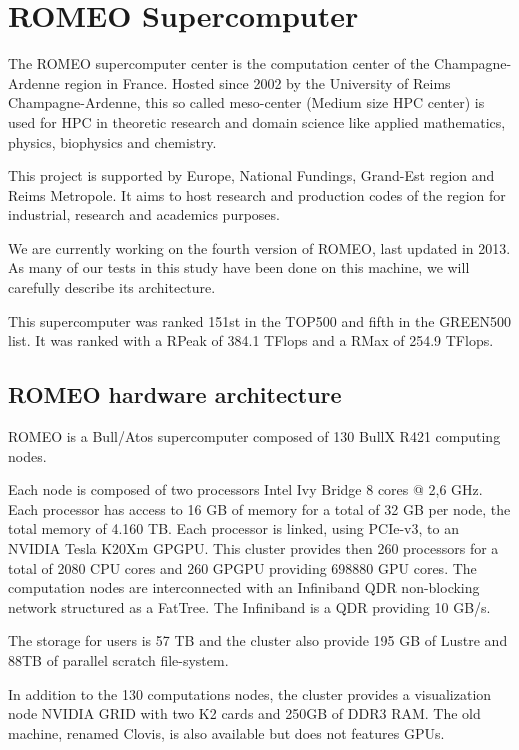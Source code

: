 \section{ROMEO Supercomputer}
The ROMEO supercomputer center is the computation center of the Champagne-Ardenne region in France. 
Hosted since 2002 by the University of Reims Champagne-Ardenne, this so called meso-center (Medium size HPC center) is used for HPC in theoretic research and domain science like applied mathematics, physics, biophysics and chemistry. 

This project is supported by Europe, National Fundings, Grand-Est region and Reims Metropole. 
It aims to host research and production codes of the region for industrial, research and academics purposes. 

We are currently working on the fourth version of ROMEO, last updated in 2013. 
As many of our tests in this study have been done on this machine, we will carefully describe its architecture. 

This supercomputer was ranked 151st in the TOP500 and fifth in the GREEN500 list.
It was ranked with a RPeak of 384.1 TFlops and a RMax of 254.9 TFlops.

\subsection{ROMEO hardware architecture}
\label{sec:part1_ROMEO}
ROMEO is a Bull/Atos supercomputer composed of 130 BullX R421 computing nodes. 

Each node is composed of two processors Intel Ivy Bridge 8 cores @ 2,6 GHz. 
Each processor has access to 16 GB of memory for a total of 32 GB per node, the total memory of 4.160 TB. 
Each processor is linked, using PCIe-v3, to an NVIDIA Tesla K20Xm GPGPU. 
This cluster provides then 260 processors for a total of 2080 CPU cores and 260 GPGPU providing 698880 GPU cores. 
The computation nodes are interconnected with an Infiniband QDR non-blocking network structured as a FatTree. 
The Infiniband is a QDR providing 10 GB/s. 

The storage for users is 57 TB and the cluster also provide 195 GB of Lustre and 88TB of parallel scratch file-system. 

In addition to the 130 computations nodes, the cluster provides a visualization node NVIDIA GRID with two K2 cards and 250GB of DDR3 RAM. 
The old machine, renamed Clovis, is also available but does not features GPUs. 

